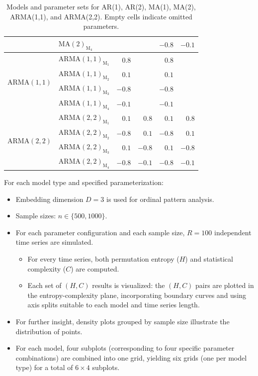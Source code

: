 \documentclass[12pt,a4paper]{article}
\begin{document}
\begin{table}[H]
\begin{tabular}{llrrrr}
		& $\mathrm{MA}(2)_{\textrm{M}_4}$  &       &      & $-0.8$ & $-0.1$ \\
		\midrule
		\multirow{4}[2]{*}{$\mathrm{ARMA}(1,1)$}  & $\mathrm{ARMA}(1,1)_{\textrm{M}_1}$ & $0.8$ &      & $0.8$  &      \\
		& $\mathrm{ARMA}(1,1)_{\textrm{M}_2}$ & $0.1$ &      & $0.1$  &      \\
		& $\mathrm{ARMA}(1,1)_{\textrm{M}_3}$ & $-0.8$ &     & $-0.8$ &      \\
		& $\mathrm{ARMA}(1,1)_{\textrm{M}_4}$ & $-0.1$ &     & $-0.1$ &      \\
		\midrule
		\multirow{4}[2]{*}{$\mathrm{ARMA}(2,2)$}  & $\mathrm{ARMA}(2,2)_{\textrm{M}_1}$ & $0.1$ & $0.8$  & $0.1$  & $0.8$  \\
		& $\mathrm{ARMA}(2,2)_{\textrm{M}_2}$ & $-0.8$ & $0.1$ & $-0.8$ & $0.1$  \\
		& $\mathrm{ARMA}(2,2)_{\textrm{M}_3}$ & $0.1$ & $-0.8$ & $0.1$  & $-0.8$ \\
		& $\mathrm{ARMA}(2,2)_{\textrm{M}_4}$ & $-0.8$ & $-0.1$ & $-0.8$ & $-0.1$ \\
		\bottomrule
	\end{tabular}
		\caption{Models and parameter sets for AR(1), AR(2), MA(1), MA(2), ARMA(1,1), and ARMA(2,2). Empty cells indicate omitted parameters.}
	\end{table}


For each model type and specified parameterization:
\begin{itemize}
	\item Embedding dimension $D=3$ is used for ordinal pattern analysis.
	\item Sample sizes: $n \in \{500, 1000\}$.
	\item For each parameter configuration and each sample size, $R=100$ independent time series are simulated.
	\begin{itemize}
	\item For every time series, both permutation entropy ($H$) and statistical complexity ($C$) are computed.
	\item Each set of $(H, C)$ results is visualized: the $(H, C)$  pairs are plotted in the entropy-complexity plane, incorporating boundary curves and using axis splits suitable to each model and time series length.
	\end{itemize}
	\item For further insight, density plots grouped by sample size illustrate the distribution of points.
	\item For each model, four subplots (corresponding to four specific parameter combinations) are combined into one grid, yielding six grids (one per model type) for a total of $6 \times 4$ subplots.
\end{itemize}
\end{document}
